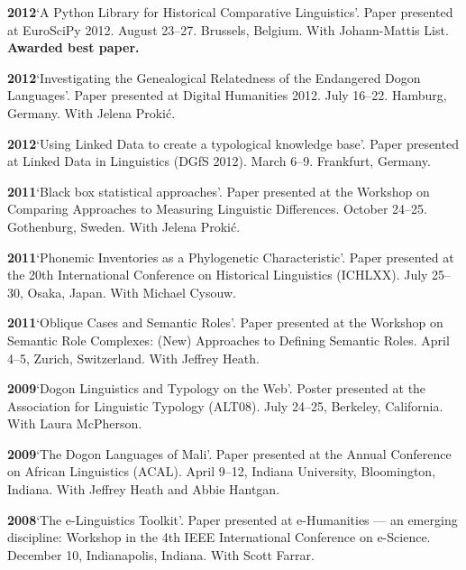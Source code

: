 \documentclass[11pt]{article}
\newcommand{\hangpara}{
 \setlength{\parindent}{0in} %
 \hangindent=0.42in %
}
\begin{document}
\vskip 6pt
\hangpara
{\bf 2012}\hspace{1ex}`A Python Library for Historical Comparative Linguistics'. Paper presented at EuroSciPy 2012. August 23--27. Brussels, Belgium. With Johann-Mattis List. \textbf{Awarded best paper.}

\vskip 6pt
\hangpara
{\bf 2012}\hspace{1ex}`Investigating the Genealogical Relatedness of the Endangered Dogon Languages'. Paper presented at Digital Humanities 2012. July 16--22. Hamburg, Germany. With Jelena Proki{\'c}.

\vskip 6pt
\hangpara
{\bf 2012}\hspace{1ex}`Using Linked Data to create a typological knowledge base'. Paper presented at Linked Data in Linguistics (DGfS 2012). March 6--9. Frankfurt, Germany.

\vskip 6pt
\hangpara
{\bf 2011}\hspace{1ex}`Black box statistical approaches'. Paper presented at the Workshop on Comparing Approaches to Measuring Linguistic Differences. October 24--25. Gothenburg, Sweden. With Jelena Proki{\'c}.

\vskip 6pt
\hangpara
{\bf 2011}\hspace{1ex}`Phonemic Inventories as a Phylogenetic Characteristic'. Paper presented at the 20th International Conference on Historical Linguistics (ICHLXX). July 25--30, Osaka, Japan. With Michael Cysouw.

\vskip 6pt
\hangpara
{\bf 2011}\hspace{1ex}`Oblique Cases and Semantic Roles'. Paper presented at the Workshop on Semantic Role Complexes: (New) Approaches to Defining Semantic Roles. April 4--5, Zurich, Switzerland. With Jeffrey Heath.

\vskip 6pt
\hangpara
{\bf 2009}\hspace{1ex}`Dogon Linguistics and Typology on the Web'. Poster presented at the Association for Linguistic Typology (ALT08). July 24--25, Berkeley, California. With Laura McPherson.

\vskip 6pt
\hangpara
{\bf 2009}\hspace{1ex}`The Dogon Languages of Mali'. Paper presented at the Annual Conference on African Linguistics (ACAL). April 9--12, Indiana University, Bloomington, Indiana. With Jeffrey Heath and Abbie Hantgan.

\vskip 6pt
\hangpara
{\bf 2008}\hspace{1ex}`The e-Linguistics Toolkit'. Paper presented at e-Humanities --- an emerging discipline: Workshop in the 4th IEEE International Conference on e-Science. December 10, Indianapolis, Indiana. With Scott Farrar.
\end{document}
